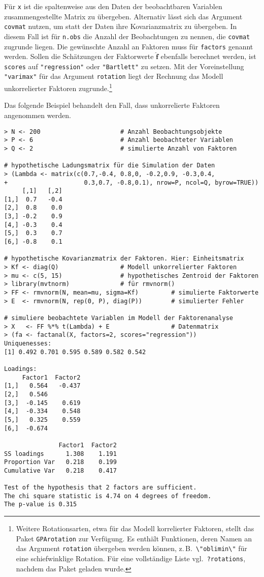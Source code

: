 Für \lstinline!x! ist die spaltenweise aus den Daten der beobachtbaren Variablen zusammengestellte Matrix zu übergeben. Alternativ lässt sich das Argument \lstinline!covmat! nutzen, um statt der Daten ihre Kovarianzmatrix zu übergeben. In diesem Fall ist für \lstinline!n.obs! die Anzahl der Beobachtungen zu nennen, die \lstinline!covmat! zugrunde liegen. Die gewünschte Anzahl an Faktoren muss für \lstinline!factors! genannt werden. Sollen die Schätzungen der Faktorwerte $\hat{\bm{f}}$ ebenfalls berechnet werden, ist \lstinline!scores! auf \lstinline!"regression"! oder \lstinline!"Bartlett"! zu setzen. Mit der Voreinstellung \lstinline!"varimax"! für das Argument \lstinline!rotation! liegt der Rechnung das Modell unkorrelierter Faktoren zugrunde.\footnote{Weitere Rotationsarten, etwa für das Modell korrelierter Faktoren, stellt das Paket \lstinline!GPArotation! \cite{Bernaards2005} zur Verfügung. Es enthält Funktionen, deren Namen an das Argument \lstinline!rotation! übergeben werden können, z.\,B.\ \lstinline!\"oblimin\"! für eine schiefwinklige Rotation. Für eine vollständige Liste vgl.\ \lstinline!?rotations!, nachdem das Paket geladen wurde.}

Das folgende Beispiel behandelt den Fall, dass unkorrelierte Faktoren angenommen werden.
\begin{lstlisting}
> N <- 200                      # Anzahl Beobachtungsobjekte
> P <- 6                        # Anzahl beobachteter Variablen
> Q <- 2                        # simulierte Anzahl von Faktoren

# hypothetische Ladungsmatrix für die Simulation der Daten
> (Lambda <- matrix(c(0.7,-0.4, 0.8,0, -0.2,0.9, -0.3,0.4,
+                     0.3,0.7, -0.8,0.1), nrow=P, ncol=Q, byrow=TRUE))
     [,1]   [,2]
[1,]  0.7   -0.4
[2,]  0.8    0.0
[3,] -0.2    0.9
[4,] -0.3    0.4
[5,]  0.3    0.7
[6,] -0.8    0.1

# hypothetische Kovarianzmatrix der Faktoren. Hier: Einheitsmatrix
> Kf <- diag(Q)                 # Modell unkorrelierter Faktoren
> mu <- c(5, 15)                # hypothetisches Zentroid der Faktoren
> library(mvtnorm)              # für rmvnorm()
> FF <- rmvnorm(N, mean=mu, sigma=Kf)         # simulierte Faktorwerte
> E  <- rmvnorm(N, rep(0, P), diag(P))        # simulierter Fehler

# simuliere beobachtete Variablen im Modell der Faktorenanalyse
> X   <- FF %*% t(Lambda) + E                 # Datenmatrix
> (fa <- factanal(X, factors=2, scores="regression"))
Uniquenesses:
[1] 0.492 0.701 0.595 0.589 0.582 0.542

Loadings:
     Factor1  Factor2
[1,]   0.564   -0.437
[2,]   0.546
[3,]  -0.145    0.619
[4,]  -0.334    0.548
[5,]   0.325    0.559
[6,]  -0.674

               Factor1  Factor2
SS loadings      1.308    1.191
Proportion Var   0.218    0.199
Cumulative Var   0.218    0.417

Test of the hypothesis that 2 factors are sufficient.
The chi square statistic is 4.74 on 4 degrees of freedom.
The p-value is 0.315
\end{lstlisting}

